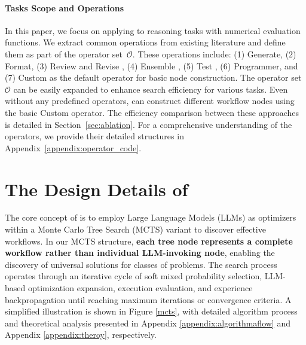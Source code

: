 \paragraph{Tasks Scope and Operations}

In this paper, we focus on applying \model to reasoning tasks with numerical evaluation functions. We extract common operations from existing literature and define them as part of the operator set~$\mathcal{O}$.
These operations include:
(1) Generate, (2) Format, (3) Review and Revise \cite{madaan2023self},
(4) Ensemble \cite{wang2022COTSC},
(5) Test \cite{li2024debug}, (6) Programmer, and (7) Custom as the default operator for basic node construction. The operator set $\mathcal{O}$ can be easily expanded to enhance search efficiency for various tasks. Even without any predefined operators, \model can construct different workflow nodes using the basic Custom operator. The efficiency comparison between these approaches is detailed in Section~\ref{sec:ablation}. For a comprehensive understanding of the operators, we provide their detailed structures in Appendix~\ref{appendix:operator_code}.

\section{The Design Details of \model} 
The core concept of \model is to employ Large Language Models (LLMs) as optimizers within a Monte Carlo Tree Search (MCTS) variant to discover effective workflows. In our MCTS structure, \textbf{each tree node represents a complete workflow rather than individual LLM-invoking node}, enabling the discovery of universal solutions for classes of problems. The search process operates through an iterative cycle of soft mixed probability selection, LLM-based optimization expansion, execution evaluation, and experience backpropagation until reaching maximum iterations or convergence criteria. A simplified illustration is shown in Figure \ref{mcts}, with detailed algorithm process and theoretical analysis presented in Appendix \ref{appendix:algorithmaflow} and Appendix \ref{appendix:theroy}, respectively.

